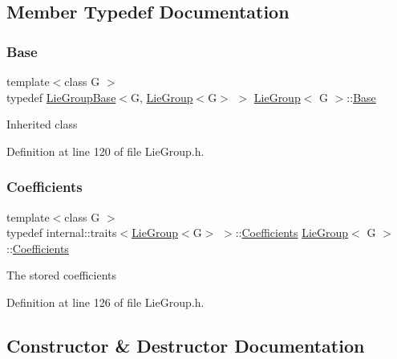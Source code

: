 \subsection{Member Typedef Documentation}
\hypertarget{class_lie_group_aac708f8905d0a77bbe8c9bae8c6ac525}{}\label{class_lie_group_aac708f8905d0a77bbe8c9bae8c6ac525} 
\subsubsection{\texorpdfstring{Base}{Base}}
{\footnotesize\ttfamily template$<$class G $>$ \\
typedef \hyperlink{class_lie_group_base}{Lie\+Group\+Base}$<$G, \hyperlink{class_lie_group}{Lie\+Group}$<$G$>$ $>$ \hyperlink{class_lie_group}{Lie\+Group}$<$ G $>$\+::\hyperlink{class_lie_group_aac708f8905d0a77bbe8c9bae8c6ac525}{Base}\hspace{0.3cm}{\ttfamily [protected]}}

Inherited class 

Definition at line 120 of file Lie\+Group.\+h.

\hypertarget{class_lie_group_a52de3c5adb933cbfa694b51bef656d5d}{}\label{class_lie_group_a52de3c5adb933cbfa694b51bef656d5d} 
\subsubsection{\texorpdfstring{Coefficients}{Coefficients}}
{\footnotesize\ttfamily template$<$class G $>$ \\
typedef internal\+::traits$<$\hyperlink{class_lie_group}{Lie\+Group}$<$G$>$ $>$\+::\hyperlink{class_lie_group_a52de3c5adb933cbfa694b51bef656d5d}{Coefficients} \hyperlink{class_lie_group}{Lie\+Group}$<$ G $>$\+::\hyperlink{class_lie_group_a52de3c5adb933cbfa694b51bef656d5d}{Coefficients}}

The stored coefficients 

Definition at line 126 of file Lie\+Group.\+h.



\subsection{Constructor \& Destructor Documentation}
\hypertarget{class_lie_group_a9c6f35315929138296ec52903f347bff}{}\label{class_lie_group_a9c6f35315929138296ec52903f347bff} 
